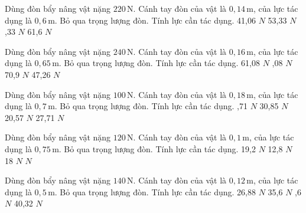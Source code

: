 \begin{ex}
Dùng đòn bẩy nâng vật nặng $220\,\text{N}$. Cánh tay đòn của vật là $0,14\,\text{m}$, của lực tác dụng là $0,6\,\text{m}$. Bỏ qua trọng lượng đòn. Tính lực cần tác dụng.
\choice
{41,06 $N$}
{53,33 $N$}
{,33 $N$}
{61,6 $N$}
\end{ex}

\begin{ex}
Dùng đòn bẩy nâng vật nặng $240\,\text{N}$. Cánh tay đòn của vật là $0,16\,\text{m}$, của lực tác dụng là $0,65\,\text{m}$. Bỏ qua trọng lượng đòn. Tính lực cần tác dụng.
\choice
{61,08 $N$}
{,08 $N$}
{70,9 $N$}
{47,26 $N$}
\end{ex}

\begin{ex}
Dùng đòn bẩy nâng vật nặng $100\,\text{N}$. Cánh tay đòn của vật là $0,18\,\text{m}$, của lực tác dụng là $0,7\,\text{m}$. Bỏ qua trọng lượng đòn. Tính lực cần tác dụng.
\choice
{,71 $N$}
{30,85 $N$}
{20,57 $N$}
{27,71 $N$}
\end{ex}

\begin{ex}
Dùng đòn bẩy nâng vật nặng $120\,\text{N}$. Cánh tay đòn của vật là $0,1\,\text{m}$, của lực tác dụng là $0,75\,\text{m}$. Bỏ qua trọng lượng đòn. Tính lực cần tác dụng.
\choice
{19,2 $N$}
{12,8 $N$}
{18 $N$}
{ $N$}
\end{ex}

\begin{ex}
Dùng đòn bẩy nâng vật nặng $140\,\text{N}$. Cánh tay đòn của vật là $0,12\,\text{m}$, của lực tác dụng là $0,5\,\text{m}$. Bỏ qua trọng lượng đòn. Tính lực cần tác dụng.
\choice
{26,88 $N$}
{35,6 $N$}
{,6 $N$}
{40,32 $N$}
\end{ex}

